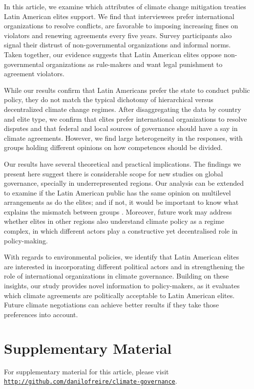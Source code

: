 \documentclass[a4paper,12pt]{article}
\begin{document}
In this article, we examine which attributes of climate change mitigation treaties Latin American elites support. We find that interviewees prefer international organizations to resolve conflicts, are favorable to imposing increasing fines on violators and renewing agreements every five years. Survey participants also signal their distrust of non-governmental organizations and informal norms. Taken together, our evidence suggests that Latin American elites oppose non-governmental organizations as rule-makers and want legal punishment to agreement violators.

While our results confirm that Latin Americans prefer the state to conduct public policy, they do not match the typical dichotomy of hierarchical versus decentralized climate change regimes. After disaggregating the data by country and elite type, we confirm that elites prefer international organizations to resolve disputes and that federal and local sources of governance should have a say in climate agreements. However, we find large heterogeneity in the responses, with groups holding different opinions on how competences should be divided.

Our results have several theoretical and practical implications. The findings we present here suggest there is considerable scope for new studies on global governance, specially in underrepresented regions. Our analysis can be extended to examine if the Latin American public has the same opinion on multilevel arrangements as do the elites; and if not, it would be important to know what explains the mismatch between groups \citep{luna2005political}. Moreover, future work may address whether elites in other regions also understand climate policy as a regime complex, in which different actors play a constructive yet decentralised role in policy-making.

With regards to environmental policies, we identify that Latin American elites are interested in incorporating different political actors and in strengthening the role of international organizations in climate governance. Building on these insights, our study provides novel information to policy-makers, as it evaluates which climate agreements are politically acceptable to Latin American elites. Future climate negotiations can achieve better results if they take those preferences into account.

\section*{Supplementary Material}
\label{sec:supplementary}

For supplementary material for this article, please visit \href{http://github.com/danilofreire/climate-governance}{\texttt{http://github.com/danilofreire/climate-governance}}.



\end{document}
